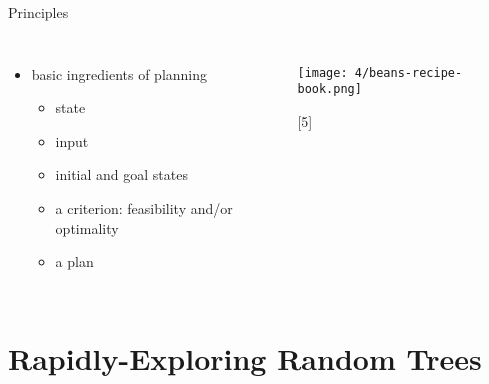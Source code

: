 \documentclass[%
  professionalfonts,%
  xcolor={%
    usenames,%
    dvipsnames,%
    svgnames,%
    table,%
    hyperref%
  }%
]{beamer}
\begin{document}
      \begin{frame}{Principles}
        \begin{columns}
          \begin{itemize}
            \item basic ingredients of planning
            \begin{itemize}
              \item state
              \item input
              \item initial and goal states
              \item a criterion: feasibility and/or optimality
              \item a plan
            \end{itemize}
          \end{itemize}
          
          \begin{figure}[h]
            \texttt{[image: 4/beans-recipe-book.png]}
            \caption{[5]}
            \label{fig:beans-recipe-book}
          \end{figure}
        \end{columns}
      \end{frame}
    
  \section{Rapidly-Exploring Random Trees}
    \begin{frame}
      \huge{}
    \end{frame}
    
\end{document}
